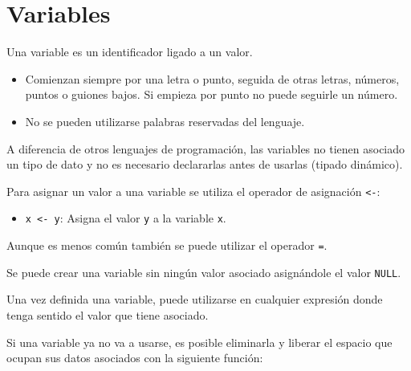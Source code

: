 \documentclass[
  spanish,
  a4paper,
]{scrreport}
\providecommand{\tightlist}{%
  \setlength{\itemsep}{0pt}\setlength{\parskip}{0pt}}
\theoremstyle{definition}
\theoremstyle{definition}
\theoremstyle{remark}
\begin{document}
\section{Variables}\label{variables}

Una variable es un identificador ligado a un valor.

\begin{tcolorbox}[enhanced jigsaw, arc=.35mm, bottomrule=.15mm, bottomtitle=1mm, breakable, colback=white, colbacktitle=quarto-callout-note-color!10!white, colframe=quarto-callout-note-color-frame, coltitle=black, left=2mm, leftrule=.75mm, opacityback=0, opacitybacktitle=0.6, rightrule=.15mm, title=\textcolor{quarto-callout-note-color}{\faInfo}\hspace{0.5em}{Reglas para nombrar variables}, titlerule=0mm, toprule=.15mm, toptitle=1mm]

\begin{itemize}
\tightlist
\item
  Comienzan siempre por una letra o punto, seguida de otras letras,
  números, puntos o guiones bajos. Si empieza por punto no puede
  seguirle un número.
\item
  No se pueden utilizarse palabras reservadas del lenguaje.
\end{itemize}

\end{tcolorbox}

A diferencia de otros lenguajes de programación, las variables no tienen
asociado un tipo de dato y no es necesario declararlas antes de usarlas
(tipado dinámico).

Para asignar un valor a una variable se utiliza el operador de
asignación \texttt{\textless{}-}:

\begin{itemize}
\tightlist
\item
  \texttt{x\ \textless{}-\ y}: Asigna el valor \texttt{y} a la variable
  \texttt{x}.
\end{itemize}

Aunque es menos común también se puede utilizar el operador \texttt{=}.

Se puede crear una variable sin ningún valor asociado asignándole el
valor \texttt{NULL}.

Una vez definida una variable, puede utilizarse en cualquier expresión
donde tenga sentido el valor que tiene asociado.

Si una variable ya no va a usarse, es posible eliminarla y liberar el
espacio que ocupan sus datos asociados con la siguiente función:
\end{document}
